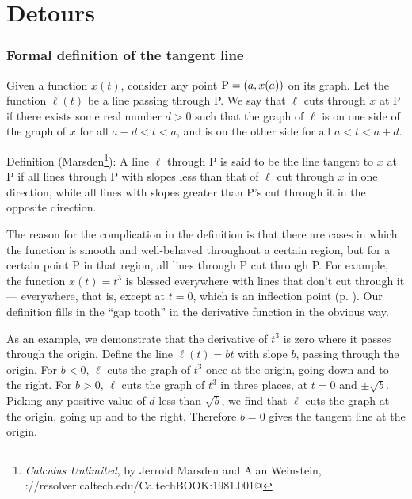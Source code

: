 \chapter{Detours}

\newcommand{\detour}[2]{\subsection{#2}\label{detour:#1}}

\vfill

\detour{def-tangent}{Formal definition of the tangent line}

Given a function $x(t)$, consider any point $\textup{P}=(a,x(a))$ on its graph.
Let the function $\ell(t)$ be a line passing through P.
We say that $\ell$ cuts through $x$ at P if
there exists some real number $d>0$ such that
the graph of $\ell$ is on one side of the graph of $x$ for
all $a-d < t < a$, and is on the other side for all $a < t < a+d$.

Definition (Marsden\footnote{\emph{Calculus Unlimited}, by Jerrold
Marsden and Alan Weinstein, \verb@http://resolver.caltech.edu/CaltechBOOK:1981.001@}): A line $\ell$ through P is said to be the  line tangent to $x$ at P if all
lines through P with slopes less than that of $\ell$ cut through $x$
in one direction, while all lines with slopes greater than P's cut through
it in the opposite direction.

The reason for the complication in the definition is that 
there are cases in which the function is smooth and well-behaved throughout a certain
region, but for a certain point P in that region,
all lines through P cut through P.
For example, the function $x(t)=t^3$ is blessed everywhere with lines that don't
cut through it --- everywhere, that is,
except at $t=0$,
which is an inflection point (p. \pageref{inflection}).
Our definition fills in the
``gap tooth'' in the derivative function in the obvious way.

\begin{eg}
As an example, we demonstrate that the derivative of $t^3$ is zero where it passes through the origin.
Define the line $\ell(t)=bt$ with slope $b$, passing
through the origin. For $b<0$, $\ell$ cuts the graph of $t^3$ once at the origin, going down and to the right.
For $b>0$, $\ell$ cuts the graph of $t^3$ in three places, at $t=0$ and $\pm\sqrt{b}$.
Picking any positive value of  $d$ less than $\sqrt{b}$,
we find that $\ell$ cuts the graph at the origin, going up and to the right. Therefore
$b=0$ gives the tangent line at the origin.
\end{eg}


